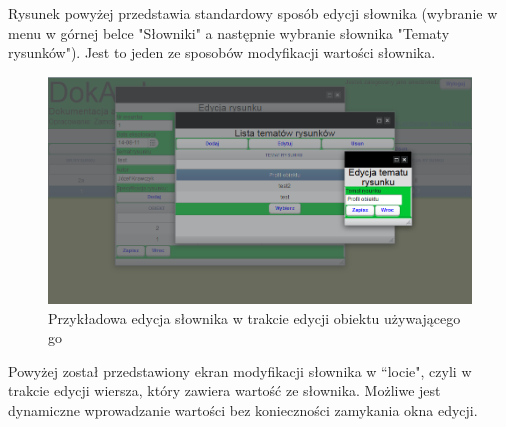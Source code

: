 Rysunek powyżej przedstawia standardowy sposób edycji słownika (wybranie w menu w górnej belce "Słowniki" a następnie wybranie słownika "Tematy rysunków"). Jest to jeden ze sposobów modyfikacji wartości słownika.

\begin{figure} [H]
    \begin{center}
	\includegraphics[scale=.6]{img/edycjaSlownikaWLocie.png}
	\caption{Przykładowa edycja słownika w trakcie edycji obiektu używającego go}
	\label{edycjaSlownikaWLocie}
    \end{center}
\end{figure}

Powyżej został przedstawiony ekran modyfikacji słownika w ``locie", czyli w trakcie edycji wiersza, który zawiera wartość ze słownika. Możliwe jest dynamiczne wprowadzanie wartości bez konieczności zamykania okna edycji.

